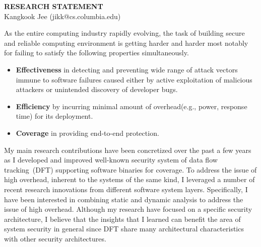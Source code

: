 \documentclass[letterpaper, 10pt]{article}
\begin{document}
\begin{small}

\begin{center}
{\LARGE \bf RESEARCH STATEMENT}\\
\vspace*{0.1cm}
{\normalsize Kangkook Jee (jikk@cs.columbia.edu)}
\end{center}



As the entire computing industry rapidly evolving, the task of building secure
and  reliable computing environment is getting harder and harder most notably
for failing to satisfy the following properties simultaneously.

\begin{itemize}

        \item {\bf Effectiveness} in detecting and preventing wide range of
                attack vectors immune to software failures caused either by
                active exploitation of malicious attackers or unintended
                discovery of developer bugs.

        \item {\bf Efficiency} by incurring minimal amount of overhead(e.g.,
                power, response time) for its deployment.

        \item {\bf Coverage} in providing end-to-end protection.  

\end{itemize}


My main research contributions have been concretized over the past a few years
as I developed and improved well-known security system of data flow
tracking~(DFT) supporting software binaries for coverage.
%
To address the issue of high overhead, inherent to the systems of the same
kind, I leveraged a number of recent research innovations from different
software system layers. Specifically, I have been interested in combining
static and dynamic analysis to address the issue of high overhead.
%
Although my research have focused on a specific security architecture, I
believe that the insights that I learned can benefit the area of system
security in general since DFT share many architectural characteristics with
other security architectures.


\end{small}
\end{document}
